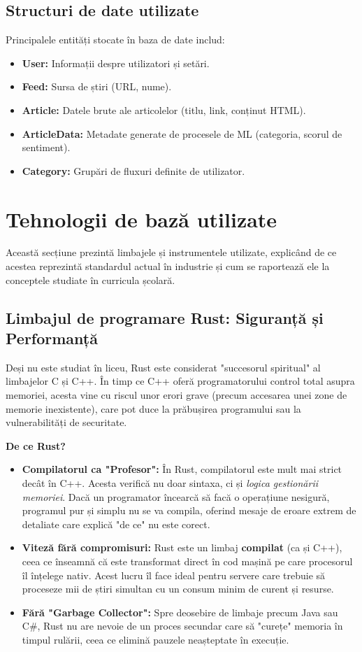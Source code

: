 \documentclass[12pt,a4paper]{article}
\begin{document}
	\subsection{Structuri de date utilizate}
	Principalele entități stocate în baza de date includ:
	\begin{itemize}
		\item \textbf{User:} Informații despre utilizatori și setări.
		\item \textbf{Feed:} Sursa de știri (URL, nume).
		\item \textbf{Article:} Datele brute ale articolelor (titlu, link, conținut HTML).
		\item \textbf{ArticleData:} Metadate generate de procesele de ML (categoria, scorul de sentiment).
		\item \textbf{Category:} Grupări de fluxuri definite de utilizator.
	\end{itemize}
	
	\newpage
	
	\section{Tehnologii de bază utilizate}
	
	Această secțiune prezintă limbajele și instrumentele utilizate, explicând de ce acestea reprezintă standardul actual în industrie și cum se raportează ele la conceptele studiate în curricula școlară.
	
	\subsection{Limbajul de programare Rust: Siguranță și Performanță}
	
	Deși nu este studiat în liceu, Rust este considerat "succesorul spiritual" al limbajelor C și C++. În timp ce C++ oferă programatorului control total asupra memoriei, acesta vine cu riscul unor erori grave (precum accesarea unei zone de memorie inexistente), care pot duce la prăbușirea programului sau la vulnerabilități de securitate.
	
	\textbf{De ce Rust?}
	\begin{itemize}
		\item \textbf{Compilatorul ca "Profesor":} În Rust, compilatorul este mult mai strict decât în C++. Acesta verifică nu doar sintaxa, ci și \textit{logica gestionării memoriei}. Dacă un programator încearcă să facă o operațiune nesigură, programul pur și simplu nu se va compila, oferind mesaje de eroare extrem de detaliate care explică "de ce" nu este corect.
		\item \textbf{Viteză fără compromisuri:} Rust este un limbaj \textbf{compilat} (ca și C++), ceea ce înseamnă că este transformat direct în cod mașină pe care procesorul îl înțelege nativ. Acest lucru îl face ideal pentru servere care trebuie să proceseze mii de știri simultan cu un consum minim de curent și resurse.
		\item \textbf{Fără "Garbage Collector":} Spre deosebire de limbaje precum Java sau C\#, Rust nu are nevoie de un proces secundar care să "curețe" memoria în timpul rulării, ceea ce elimină pauzele neașteptate în execuție.
	\end{itemize}
	
\end{document}
